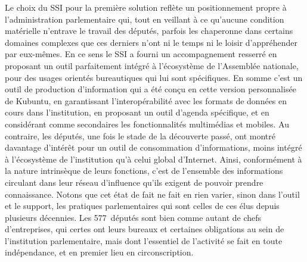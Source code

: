 \documentclass{FramateX}
\begin{document}
\begin{refsection}
Le choix du SSI pour la première solution reflète un positionnement
propre à l'administration parlementaire qui, tout en veillant à ce
qu'aucune condition matérielle n'entrave le travail des députés,
parfois les chaperonne dans certains domaines complexes que ces
derniers n'ont ni le temps ni le loisir d'appréhender par eux-mêmes. En
ce sens le SSI a fourni un accompagnement resserré en proposant un
outil parfaitement intégré à l'écosystème de l'Assemblée nationale,
pour des usages orientés bureautiques qui lui sont spécifiques. En
somme c'est un outil de production d'information qui a été conçu en
cette version personnalisée de Kubuntu, en garantissant
l'interopérabilité avec les formats de données en cours dans
l'institution, en proposant un outil d'agenda spécifique, et en
considérant comme secondaires les fonctionnalités multimédias et
mobiles. Au contraire, les députés, une fois le stade de la découverte
passé, ont montré davantage d'intérêt pour un outil de consommation
d'informations, moins intégré à l'écosystème de l'institution qu'à
celui global d'Internet. Ainsi, conformément à la nature intrinsèque de
leurs fonctions, c'est de l'ensemble des informations circulant dans
leur réseau d'influence qu'ils exigent de pouvoir prendre connaissance.
Notons que cet état de fait ne fait en rien varier, sinon dans l'outil
et le support, les pratiques parlementaires qui sont celles de ces élus
depuis plusieurs décennies. Les 577~députés sont bien comme autant de
chefs d'entreprises, qui certes ont leurs bureaux et certaines
obligations au sein de l'institution parlementaire, mais dont
l'essentiel de l'activité se fait en toute indépendance, et en premier
lieu en circonscription. 


\end{refsection}
\end{document}
